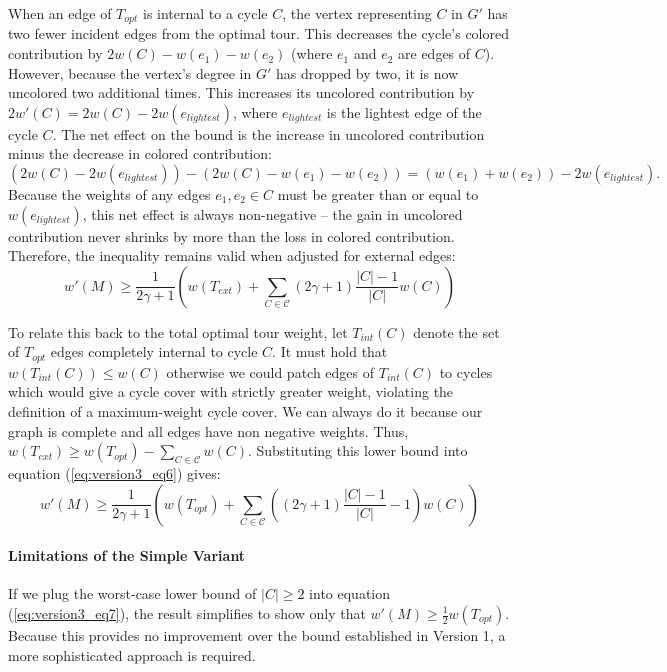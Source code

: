 When an edge of $T_{opt}$ is internal to a cycle $C$, the vertex representing
$C$ in $G'$ has two fewer incident edges from the optimal tour. This decreases
the cycle's colored contribution by $2w(C) - w(e_1) - w(e_2)$ (where $e_1$ and
$e_2$ are edges of $C$). However, because the vertex's degree in $G'$ has
dropped by two, it is now uncolored two additional times. This increases its
uncolored contribution by $2w'(C) = 2w(C) - 2w(e_{lightest})$, where
$e_{lightest}$ is the lightest edge of the cycle $C$. The net effect on the
bound is the increase in uncolored contribution minus the decrease in colored
contribution:
\begin{equation}
\left(2w(C) - 2w(e_{lightest})\right) - \left(2w(C) - w(e_1) - w(e_2)\right) = \left(w(e_1) + w(e_2)\right) - 2w(e_{lightest}).
\end{equation}
Because the weights of any edges $e_1, e_2 \in C$ must be greater than or equal
to $w(e_{lightest})$, this net effect is always non-negative -- the gain in
uncolored contribution never shrinks by more than the loss in colored
contribution. Therefore, the inequality remains valid when adjusted for external
edges:
\begin{equation} \label{eq:version3_eq6}
w'(M) \ge \frac{1}{2\gamma + 1} \left( w(T_{ext}) + \sum_{C \in \mathcal{C}} (2\gamma + 1)\frac{|C| - 1}{|C|}w(C) \right)
\end{equation}

To relate this back to the total optimal tour weight, let $T_{int}(C)$ denote
the set of $T_{opt}$ edges completely internal to cycle $C$. It must hold that
$w(T_{int}(C)) \le w(C)$ otherwise we could patch edges of $T_{int}(C)$ to
cycles which would give a cycle cover with strictly greater weight, violating
the definition of a maximum-weight cycle cover. We can always do it because our
graph is complete and all edges have non negative weights. Thus, $w(T_{ext}) \ge
w(T_{opt}) - \sum_{C \in \mathcal{C}} w(C)$. Substituting this lower bound into
equation (\ref{eq:version3_eq6}) gives:
\begin{equation} \label{eq:version3_eq7}
w'(M) \ge \frac{1}{2\gamma + 1} \left( w(T_{opt}) + \sum_{C \in \mathcal{C}} \left( (2\gamma + 1)\frac{|C| - 1}{|C|} - 1 \right)w(C) \right)
\end{equation}

\paragraph{Limitations of the Simple Variant}
If we plug the worst-case lower bound of $|C| \ge 2$ into equation
(\ref{eq:version3_eq7}), the result simplifies to show only that $w'(M) \ge
\frac{1}{2}w(T_{opt})$. Because this provides no improvement over the bound
established in Version 1, a more sophisticated approach is required.

